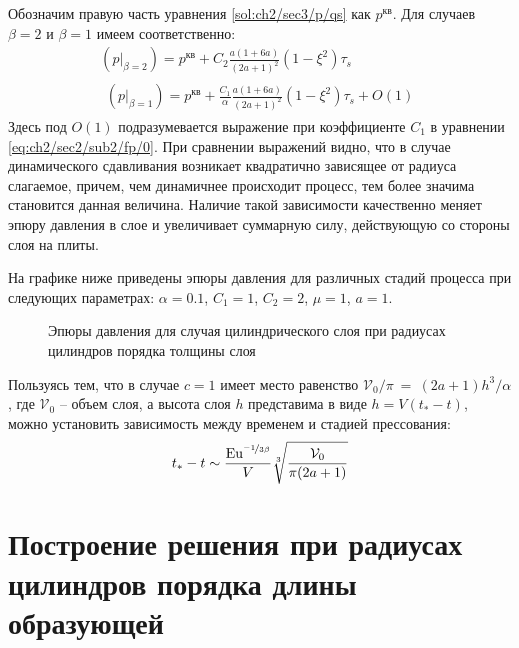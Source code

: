 Обозначим правую часть уравнения \cref{sol:ch2/sec3/p/qs} как $p^\text{кв}$. Для случаев $\beta=2$ и $\beta=1$ имеем соответственно:
\begin{gather}
  \left(p\lvert_{\beta=2}\right) = p^\text{кв} + C_2 \frac{a(1+6a)}{(2a+1)^2}\left(1-\xi^2\right) \tau_{s}
  \\
  \begin{multlined}
    \left(p\lvert_{\beta=1}\right) = p^\text{кв}+ \frac{C_1}{\alpha} \frac{a(1+6a)}{(2a+1)^2}\left(1-\xi^2\right)\tau_{s} + O(1)
  \end{multlined}
\end{gather}
Здесь под $O(1)$ подразумевается выражение при коэффициенте $C_1$ в уравнении \cref{eq:ch2/sec2/sub2/fp/0}.
При сравнении выражений видно, что в случае динамического сдавливания возникает квадратично зависящее от радиуса слагаемое, причем, чем динамичнее происходит процесс, тем более значима становится данная величина. Наличие такой зависимости качественно меняет эпюру давления в слое и увеличивает суммарную силу, действующую со стороны слоя на плиты.

На графике ниже приведены эпюры давления для различных стадий процесса при следующих параметрах: $\alpha=0.1$, $C_1=1$, $C_2=2$, $\mu=1$, $a=1$.
\begin{figure}[ht!]
  \caption{Эпюры давления для случая цилиндрического слоя при радиусах цилиндров порядка толщины слоя}
  \label{fig:ch2/sec3/pressure}
\end{figure}

Пользуясь тем, что в случае $c=1$ имеет место равенство $\mathcal{V}_0 / \pi~=~\left(2a + 1\right) h^{3} / \alpha$, где $\mathcal{V}_0$ -- объем слоя, а высота слоя $h$ представима в виде $h=V \left(t_*-t\right)$, можно установить зависимость между временем и стадией прессования:
\begin{equation}
  t_* - t \sim \frac{\text{Eu}^{\nicefrac{-1}{3\beta}}}{V}\sqrt[3]{\frac{\mathcal{V}_0}{\pi(2a+1)}}
\end{equation}

\section{Построение решения при радиусах цилиндров порядка длины образующей}\label{sec:ch2/sec4}

